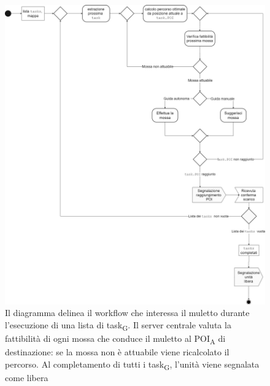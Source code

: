 \begin{figure}[H]
	\centering
	\includegraphics[scale=0.23]{res/images/diagramma_di_attivita2.png}
	\caption[Diagramma di attivita\textsubscript{G} per l'evasione di una lista di task\textsubscript{G} da parte di un muletto]{Il diagramma delinea il workflow che interessa il muletto durante l'esecuzione di una lista di task\textsubscript{G}. Il server centrale valuta la fattibilità di ogni mossa che conduce il muletto al POI\textsubscript{A} di destinazione: se la mossa non è attuabile viene ricalcolato il percorso. Al completamento di tutti i task\textsubscript{G}, l'unità viene segnalata come libera}
\end{figure}





